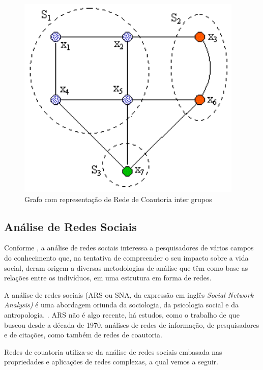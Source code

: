 \documentclass[12pt]{article}
\begin{document}
\begin{figure}[H]
\centering
\includegraphics[scale=0.8]{images/inter-grafo.pdf}
\caption{Grafo com representação de Rede de Coautoria inter grupos}
\label{grafo2}
\end{figure}

\subsection{Análise de Redes Sociais}

Conforme \cite{Silva2006}, a análise de redes sociais interessa a pesquisadores de vários campos do conhecimento que, na tentativa de compreender o seu impacto sobre a vida social, deram origem a diversas metodologias de análise que têm como base as relações entre os indivíduos, em uma estrutura em forma de redes.

A análise de redes sociais (ARS ou SNA, da expressão em inglês \textit{Social Network Analysis)} é uma abordagem oriunda da sociologia, da psicologia social e da antropologia. \cite{freeman1996some,wasserman1994social}. ARS não é algo recente, há estudos, como o trabalho de \cite{otte2002social} que buscou desde a década de 1970, análises de redes de informação, de pesquisadores e de citações, como também de redes de coautoria.

 Redes de couatoria utiliza-se da análise de redes sociais embasada nas propriedades e aplicações de redes complexas, a qual vemos a seguir.
\end{document}
